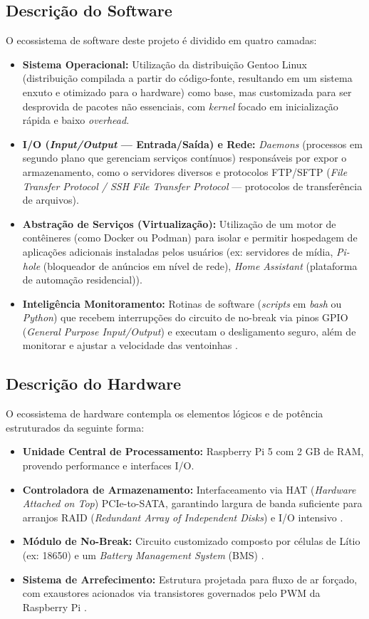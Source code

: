 \documentclass[a4paper,12pt]{article}
\begin{document}
\subsection{Descrição do Software}
O ecossistema de software deste projeto é dividido em quatro camadas:  
\begin{itemize}  
    \item \textbf{Sistema Operacional:} Utilização da distribuição Gentoo Linux (distribuição compilada a partir do código-fonte, resultando em um sistema enxuto e otimizado para o hardware) como base, mas customizada para ser desprovida de pacotes não essenciais, com \textit{kernel} focado em inicialização rápida e baixo \textit{overhead}.
    \item \textbf{I/O (\textit{Input/Output} --- Entrada/Saída) e Rede:} \textit{Daemons} (processos em segundo plano que gerenciam serviços contínuos) responsáveis por expor o armazenamento, como o servidores diversos e protocolos FTP/SFTP (\textit{File Transfer Protocol / SSH File Transfer Protocol} --- protocolos de transferência de arquivos).
    \item \textbf{Abstração de Serviços (Virtualização):} Utilização de um motor de contêineres (como Docker ou Podman) para isolar e permitir hospedagem de aplicações adicionais instaladas pelos usuários (ex: servidores de mídia, \textit{Pi-hole} (bloqueador de anúncios em nível de rede), \textit{Home Assistant} (plataforma de automação residencial)).
    \item \textbf{Inteligência Monitoramento:} Rotinas de software (\textit{scripts} em \textit{bash} ou \textit{Python}) que recebem interrupções do circuito de no-break via pinos GPIO (\textit{General Purpose Input/Output}) e executam o desligamento seguro, além de monitorar e ajustar a velocidade das ventoinhas \cite{donovan2015}.
\end{itemize}  

\subsection{Descrição do Hardware} 
O ecossistema de hardware contempla os elementos lógicos e de potência estruturados da seguinte forma:
\begin{itemize}  
    \item \textbf{Unidade Central de Processamento:} Raspberry Pi 5 com 2 GB de RAM, provendo performance e interfaces I/O.
    \item \textbf{Controladora de Armazenamento:} Interfaceamento via HAT (\textit{Hardware Attached on Top}) PCIe-to-SATA, garantindo largura de banda suficiente para arranjos RAID (\textit{Redundant Array of Independent Disks}) e I/O intensivo \cite{halfacree2023}.
    \item \textbf{Módulo de No-Break:} Circuito customizado composto por células de Lítio (ex: 18650) e um \textit{Battery Management System} (BMS) \cite{plett2015}.
    \item \textbf{Sistema de Arrefecimento:} Estrutura projetada para fluxo de ar forçado, com exaustores acionados via transistores governados pelo PWM da Raspberry Pi \cite{lasance2005}.
\end{itemize}  
\end{document}
